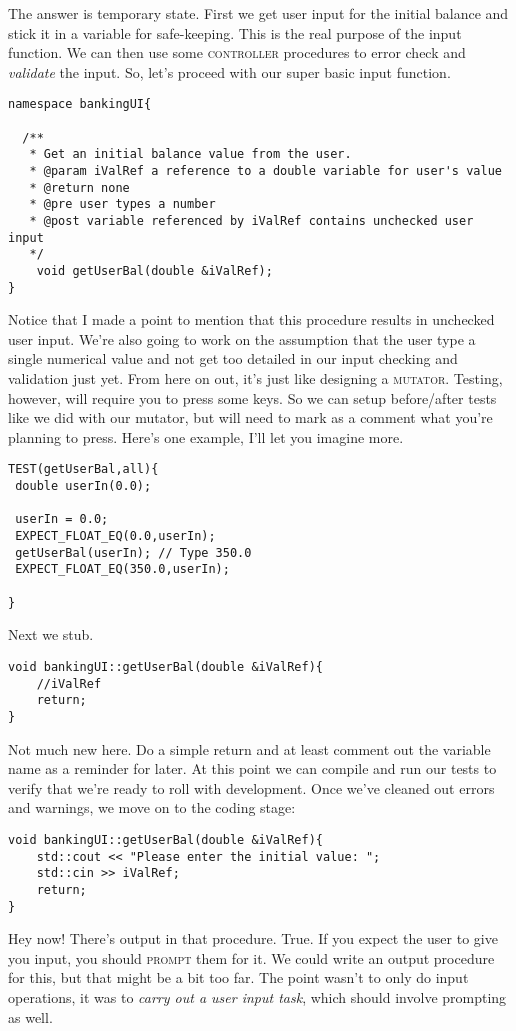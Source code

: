 \documentclass[]{tufte-handout}
\begin{document}
The answer is temporary state. First we get user input for the initial balance and stick it in a variable for safe-keeping. This is the real purpose of the input function. We can then use some \textsc{controller} procedures to error check and \textit{validate} the input. So, let's proceed with our super basic input function.
\begin{verbatim}
namespace bankingUI{

  /**
   * Get an initial balance value from the user. 
   * @param iValRef a reference to a double variable for user's value
   * @return none
   * @pre user types a number
   * @post variable referenced by iValRef contains unchecked user input
   */
	void getUserBal(double &iValRef);   
}	
\end{verbatim}
Notice that I made a point to mention that this procedure results in unchecked user input. We're also going to work on the assumption that the user type a single numerical value and not get too detailed in our input checking and validation just yet. From here on out, it's just like designing a \textsc{mutator}. Testing, however, will require you to press some keys. So we can setup before/after tests like we did with our mutator, but will need to mark as a comment what you're planning to press. Here's one example, I'll let you imagine more.
\begin{verbatim}
TEST(getUserBal,all){
 double userIn(0.0);
 
 userIn = 0.0;
 EXPECT_FLOAT_EQ(0.0,userIn);
 getUserBal(userIn); // Type 350.0
 EXPECT_FLOAT_EQ(350.0,userIn);

}
\end{verbatim}

Next we stub.
\begin{verbatim}
void bankingUI::getUserBal(double &iValRef){
	//iValRef
	return;
}
\end{verbatim}
Not much new here. Do a simple return and at least comment out the variable name as a reminder for later. At this point we can compile and run our tests to verify that we're ready to roll with development. Once we've cleaned out errors and warnings, we move on to the coding stage:
\begin{verbatim}
void bankingUI::getUserBal(double &iValRef){
	std::cout << "Please enter the initial value: ";
	std::cin >> iValRef;
	return;
}
\end{verbatim}
Hey now! There's output in that procedure. True. If you expect the user to give you input, you should \textsc{prompt} them for it. We could write an output procedure for this, but that might be a bit too far. The point wasn't to only do input operations, it was to \textit{carry out a user input task}, which should involve prompting as well. 
\end{document}
